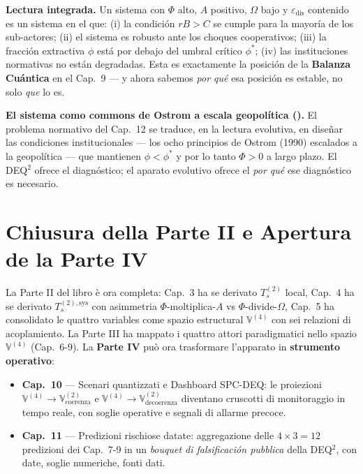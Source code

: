\Proved{} \textbf{Lectura integrada.} Un sistema con \(\Phi\) alto,
\(A\) positivo, \(\Omega\) bajo y \(\varepsilon_{\text{dis}}\) contenido
es un sistema en el que: (i) la condici\'{o}n \(rB > C\) se cumple para
la mayor\'{i}a de los sub-actores; (ii) el sistema es robusto ante los
choques cooperativos; (iii) la fracci\'{o}n extractiva \(\phi\) est\'{a}
por debajo del umbral cr\'{i}tico \(\phi^*\); (iv) las instituciones
normativas no est\'{a}n degradadas. Esta es exactamente la posici\'{o}n
de la \textbf{Balanza Cu\'{a}ntica} en el Cap.~9 --- y ahora sabemos
\emph{por qu\'{e}} esa posici\'{o}n es estable, no solo \emph{que} lo es.

\Hypoth{} \textbf{El sistema como commons de Ostrom a escala
geopol\'{i}tica (\Hypoth{}).} El problema normativo del Cap.~12 se
traduce, en la lectura evolutiva, en dise\~{n}ar las condiciones
institucionales --- los ocho principios de Ostrom (1990) escalados a la
geopolítica --- que mantienen \(\phi < \phi^*\) y por lo tanto
\(\Phi > 0\) a largo plazo. El DEQ$^2$ ofrece el diagn\'{o}stico; el
aparato evolutivo ofrece el \emph{por qu\'{e}} ese diagn\'{o}stico es
necesario.



\section{Chiusura della Parte II e Apertura de la Parte
IV}\label{chiusura-della-parte-ii-e-apertura-della-parte-iv}

La Parte II del libro è ora completa: Cap.~3 ha se derivato \(T_s^{(2)}\)
local, Cap.~4 ha se derivato \(T_s^{(2),\text{sys}}\) con asimmetria
\(\Phi\)-moltiplica-\(A\) vs \(\Phi\)-divide-\(\Omega\), Cap.~5 ha
consolidato le quattro variables come spazio estructural
\(\mathbb{V}^{(4)}\) con sei relazioni di acoplamiento. La Parte III ha
mappato i quattro attori paradigmatici nello spazio \(\mathbb{V}^{(4)}\)
(Cap.~6-9). La \textbf{Parte IV} può ora trasformare l'apparato in
\textbf{strumento operativo}:

\begin{itemize}
\tightlist
\item
  \textbf{Cap.~10} --- Scenari quantizzati e Dashboard SPC-DEQ: le
  proiezioni \(\mathbb{V}^{(4)} \to \mathbb{V}^{(2)}_{\text{coerenza}}\)
  e \(\mathbb{V}^{(4)} \to \mathbb{V}^{(2)}_{\text{decoerenza}}\)
  diventano cruscotti di monitoraggio in tempo reale, con soglie
  operative e segnali di allarme precoce.
\item
  \textbf{Cap.~11} --- Predizioni rischiose datate: aggregazione delle
  \(4 \times 3 = 12\) predizioni dei Cap.~7-9 in un \emph{bouquet di
  falsificación pubblica} della DEQ$^2$, con date, soglie numeriche, fonti
  dati.
\end{itemize}


